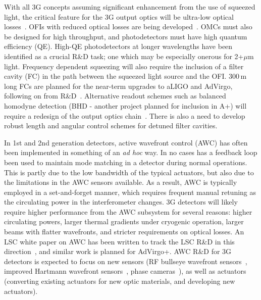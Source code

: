 With all 3G concepts assuming significant enhancement from the use of squeezed light, the critical feature for the 3G output optics will be ultra-low optical losses~\cite{squeeze_lossbudget}. OFIs with reduced optical losses are being developed~\cite{EGOLLFI,UFLLFI}.
OMCs must also be designed for high throughput, and photodetectors must have high quantum efficiency (QE). High-QE photodetectors at longer wavelengths have been identified as a crucial R\&D task; one which may be especially onerous for 2+$\mu$m light. 
Frequency dependent squeezing will also require the inclusion of a filter cavity (FC) in the path between the squeezed light source and the OFI. 300\,m long FCs are planned for the near-term upgrades to aLIGO and AdVirgo, following on from R\&D~\cite{MITFC,TAMA_FDS2016}.
Alternative readout schemes such as balanced homodyne detection (BHD - another project planned for inclusion in A+) will require a redesign of the output optics chain~\cite{BHD}. There is also a need to develop robust length and angular control schemes for detuned filter cavities.

In 1st and 2nd generation detectors, active wavefront control (AWC) has often been implemented in something of an \emph{ad hoc} way. In no cases has a feedback loop been used to maintain mode matching in a detector during normal operations. This is partly due to the low bandwidth of the typical actuators, but also due to the limitations in the AWC sensors available. As a result, AWC is typically employed in a set-and-forget manner, which requires frequent manual retuning as the circulating power in the interferometer changes. 3G detectors will likely require higher performance from the AWC subsystem for several reasons: higher circulating powers, larger thermal gradients under cryogenic operation, larger beams with flatter wavefronts, and stricter requirements on optical losses. An LSC white paper on AWC has been written to track the LSC R\&D in this direction~\cite{aLIGO_AWC}, and similar work is planned for AdVirgo+. AWC R\&D for 3G detectors is expected to focus on new sensors (RF bullseye wavefront sensors~\cite{bullseye}, improved Hartmann wavefront sensors~\cite{HWS}, phase cameras~\cite{phasecam}), as well as actuators (converting existing actuators for new optic materials, and developing new actuators). 

